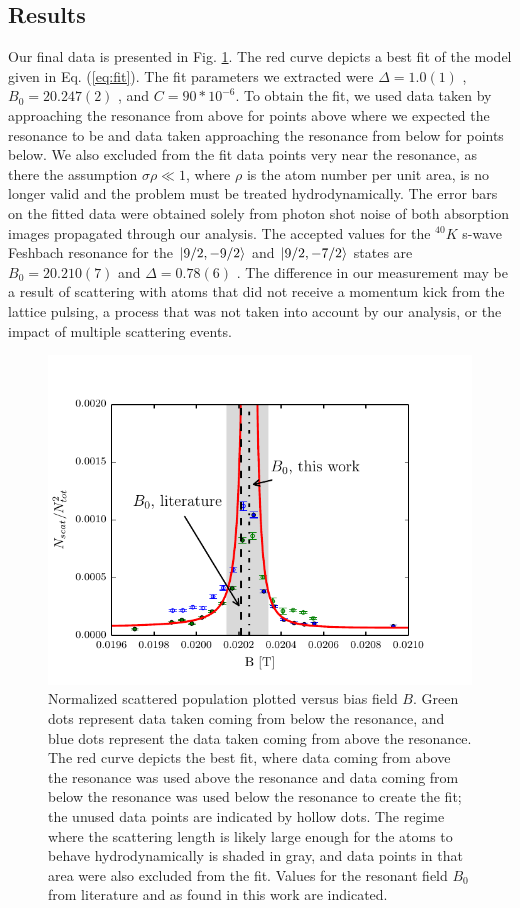 \documentclass[12pt]{iopart}
\begin{document}
\subsection{Results}
Our final data is presented in Fig. \ref{fig:fittedFractions}. The red curve depicts a best fit of the model given in Eq. (\ref{eq:fit}). The fit parameters we extracted were $\Delta = 1.0(1)$  \mT{}, $B_0 = 20.247(2)$  \mT{}, and $C=90*10^{-6}$. To obtain the fit, we used data taken by approaching the resonance from above for points above where we expected the resonance to be and data taken approaching the resonance from below for points below. We also excluded from the fit data points very near the resonance, as there the assumption $\sigma\rho\ll1$, where $\rho$ is the atom number per unit area, is no longer valid and the problem must be treated hydrodynamically. The error bars on the fitted data were obtained solely from photon shot noise of both absorption images propagated through our analysis.
The accepted values for the $^{40}K$ s-wave Feshbach resonance for the  $\mathinner{|{9/2,-9/2}\rangle}$ and $\mathinner{|{9/2,-7/2}\rangle}$ states are $B_0=20.210(7)$  \mT{} and $\Delta=0.78(6)$  \mT{} \cite{Regal04}. The difference in our measurement may be a result of scattering with atoms that did not receive a momentum kick from the lattice pulsing, a process that was not taken into account by our analysis, or the impact of multiple scattering events. 
\begin{figure}
	\includegraphics{figure11.pdf}
\caption{Normalized scattered population plotted versus bias field $B$. Green dots represent data taken coming from below the resonance, and blue dots represent the data taken coming from above the resonance. The red curve depicts the best fit, where data coming from above the resonance was used above the resonance and data coming from below the resonance was used below the resonance to create the fit; the unused data points are indicated by hollow dots. The regime where the scattering length is likely large enough for the atoms to behave hydrodynamically is shaded in gray, and data points in that area were also excluded from the fit. Values for the resonant field $B_0$ from literature and as found in this work are indicated.    }  
\label{fig:fittedFractions}
\end{figure}
\end{document}
